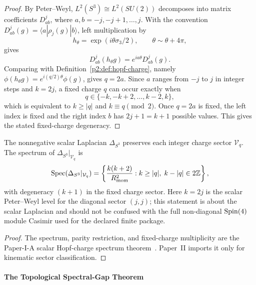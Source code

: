 \documentclass[12pt,a4paper]{article}
\begin{document}
\begin{proof}
By Peter--Weyl, \(L^2(S^3)\cong L^2(SU(2))\) decomposes into matrix
coefficients \(D^j_{ab}\), where \(a,b=-j,-j+1,\ldots,j\).  With the
convention \(D^j_{ab}(g)=\langle a|\rho_j(g)|b\rangle\), left multiplication by
\[
h_\theta=\exp(i\theta\sigma_3/2),
\qquad \theta\sim\theta+4\pi,
\]
gives
\[
D^j_{ab}(h_\theta g)=e^{ia\theta}D^j_{ab}(g).
\]
Comparing with Definition~\ref{p2:def:hopf-charge}, namely
\(\phi(h_\theta g)=e^{i(q/2)\theta}\phi(g)\), gives \(q=2a\).  Since
\(a\) ranges from \(-j\) to \(j\) in integer steps and \(k=2j\), a fixed
charge \(q\) can occur exactly when
\[
q\in\{-k,-k+2,\ldots,k-2,k\},
\]
which is equivalent to \(k\ge |q|\) and \(k\equiv q\pmod2\).  Once
\(q=2a\) is fixed, the left index is fixed and the right index \(b\) has
\(2j+1=k+1\) possible values.  This gives the stated fixed-charge degeneracy.
\end{proof}

\begin{theorem}
\label{p2:thm:spectrum-by-charge}
The nonnegative scalar Laplacian $\Delta_{S^3}$ preserves each integer charge sector $\mathcal{V}_q$. The spectrum of $\Delta_{S^3}|_{\mathcal{V}_q}$ is
\begin{equation}
\mathrm{Spec}(\Delta_{S^3}|_{\mathcal{V}_q}) = \left\{ \frac{k(k+2)}{R_{\mathrm{mom}}^2} : k \geq |q|, \; k - |q| \in 2\mathbb{Z} \right\},
\label{p2:eq:spectrum-charge-n}
\end{equation}
with degeneracy $(k+1)$ in the fixed charge sector.  Here $k=2j$ is the
scalar Peter--Weyl level for the diagonal sector $(j,j)$; this statement is
about the scalar Laplacian and should not be confused with the full
non-diagonal $\mathrm{Spin}(4)$ module Casimir used for the declared finite package.
\end{theorem}

\begin{proof}
The spectrum, parity restriction, and fixed-charge multiplicity are the
Paper-I-A scalar Hopf-charge spectrum theorem~\cite{Kugelmann2026a}.
Paper~II imports it only for kinematic sector classification.
\end{proof}

\paragraph{The Topological Spectral-Gap Theorem}
\end{document}
